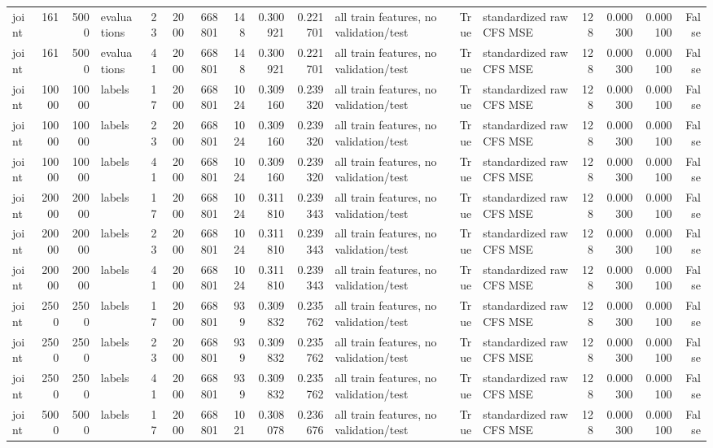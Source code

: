 \begin{tabular}{lrrlrrrrrrlrlrrrr}
joint & 161 & 5000 & evaluations & 23 & 2000 & 668801 & 148 & 0.300921 & 0.221701 & all train features, no validation/test & True & standardized raw CFS MSE & 128 & 0.000300 & 0.000100 & False \\
joint & 161 & 5000 & evaluations & 41 & 2000 & 668801 & 148 & 0.300921 & 0.221701 & all train features, no validation/test & True & standardized raw CFS MSE & 128 & 0.000300 & 0.000100 & False \\
joint & 10000 & 10000 & labels & 17 & 2000 & 668801 & 1024 & 0.309160 & 0.239320 & all train features, no validation/test & True & standardized raw CFS MSE & 128 & 0.000300 & 0.000100 & False \\
joint & 10000 & 10000 & labels & 23 & 2000 & 668801 & 1024 & 0.309160 & 0.239320 & all train features, no validation/test & True & standardized raw CFS MSE & 128 & 0.000300 & 0.000100 & False \\
joint & 10000 & 10000 & labels & 41 & 2000 & 668801 & 1024 & 0.309160 & 0.239320 & all train features, no validation/test & True & standardized raw CFS MSE & 128 & 0.000300 & 0.000100 & False \\
joint & 20000 & 20000 & labels & 17 & 2000 & 668801 & 1024 & 0.311810 & 0.239343 & all train features, no validation/test & True & standardized raw CFS MSE & 128 & 0.000300 & 0.000100 & False \\
joint & 20000 & 20000 & labels & 23 & 2000 & 668801 & 1024 & 0.311810 & 0.239343 & all train features, no validation/test & True & standardized raw CFS MSE & 128 & 0.000300 & 0.000100 & False \\
joint & 20000 & 20000 & labels & 41 & 2000 & 668801 & 1024 & 0.311810 & 0.239343 & all train features, no validation/test & True & standardized raw CFS MSE & 128 & 0.000300 & 0.000100 & False \\
joint & 2500 & 2500 & labels & 17 & 2000 & 668801 & 939 & 0.309832 & 0.235762 & all train features, no validation/test & True & standardized raw CFS MSE & 128 & 0.000300 & 0.000100 & False \\
joint & 2500 & 2500 & labels & 23 & 2000 & 668801 & 939 & 0.309832 & 0.235762 & all train features, no validation/test & True & standardized raw CFS MSE & 128 & 0.000300 & 0.000100 & False \\
joint & 2500 & 2500 & labels & 41 & 2000 & 668801 & 939 & 0.309832 & 0.235762 & all train features, no validation/test & True & standardized raw CFS MSE & 128 & 0.000300 & 0.000100 & False \\
joint & 5000 & 5000 & labels & 17 & 2000 & 668801 & 1021 & 0.308078 & 0.236676 & all train features, no validation/test & True & standardized raw CFS MSE & 128 & 0.000300 & 0.000100 & False \\

\end{tabular}

